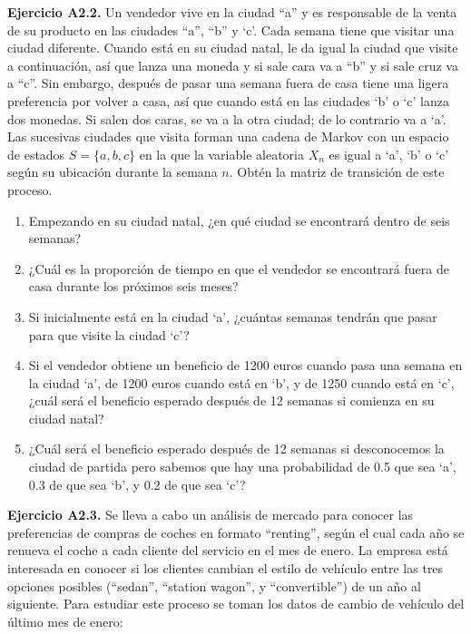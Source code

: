 \documentclass[
]{book}
\providecommand{\tightlist}{%
  \setlength{\itemsep}{0pt}\setlength{\parskip}{0pt}}
\theoremstyle{definition}
\theoremstyle{definition}
\theoremstyle{definition}
\theoremstyle{definition}
\theoremstyle{remark}
\begin{document}
\textbf{Ejercicio A2.2.} Un vendedor vive en la ciudad ``a'' y es responsable de la venta de su producto en las ciudades ``a'', ``b'' y `c'. Cada semana tiene que visitar una ciudad diferente. Cuando está en su ciudad natal, le da igual la ciudad que visite a continuación, así que lanza una moneda y si sale cara va a ``b'' y si sale cruz va a ``c''. Sin embargo, después de pasar una semana fuera de casa tiene una ligera preferencia por volver a casa, así que cuando está en las ciudades `b' o `c' lanza dos monedas. Si salen dos caras, se va a la otra ciudad; de lo contrario va a `a'. Las sucesivas ciudades que visita forman una cadena de Markov con un espacio de estados \(S = \{a, b, c\}\) en la que la variable aleatoria \(X_n\) es igual a `a', `b' o `c' según su ubicación durante la semana \(n\). Obtén la matriz de transición de este proceso.

\begin{enumerate}
\def\labelenumi{\arabic{enumi}.}
\tightlist
\item
  Empezando en su ciudad natal, ¿en qué ciudad se encontrará dentro de seis semanas?
\item
  ¿Cuál es la proporción de tiempo en que el vendedor se encontrará fuera de casa durante los próximos seis meses?
\item
  Si inicialmente está en la ciudad `a', ¿cuántas semanas tendrán que pasar para que visite la ciudad `c'?
\item
  Si el vendedor obtiene un beneficio de 1200 euros cuando pasa una semana en la ciudad `a', de 1200 euros cuando está en `b', y de 1250 cuando está en `c', ¿cuál será el beneficio esperado después de 12 semanas si comienza en su ciudad natal?
\item
  ¿Cuál será el beneficio esperado después de 12 semanas si desconocemos la ciudad de partida pero sabemos que hay una probabilidad de 0.5 que sea `a', 0.3 de que sea `b', y 0.2 de que sea `c'?
\end{enumerate}

\textbf{Ejercicio A2.3.} Se lleva a cabo un análisis de mercado para conocer las preferencias de compras de coches en formato ``renting'', según el cual cada año se renueva el coche a cada cliente del servicio en el mes de enero. La empresa está interesada en conocer si los clientes cambian el estilo de vehículo entre las tres opciones posibles (``sedan'', ``station wagon'', y ``convertible'') de un año al siguiente. Para estudiar este proceso se toman los datos de cambio de vehículo del último mes de enero:
\end{document}

